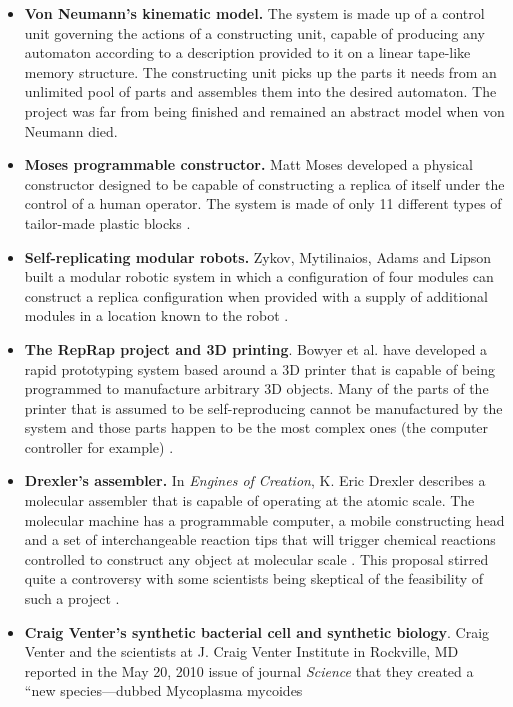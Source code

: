 \begin{itemize}
\item \textbf{Von Neumann’s kinematic model.} The system is made up of a
control unit governing the actions of a constructing unit, capable of
producing any automaton according to a description provided to it on a
linear tape-like memory structure. The constructing unit picks up the
parts it needs from an unlimited pool of parts and assembles them into
the desired automaton. The project was far from being finished and
remained an abstract model when von Neumann died.
\item \textbf{Moses{\textquotesingle} programmable constructor.} Matt Moses developed a physical constructor designed to be
capable of constructing a replica of itself under the control of a
human operator. The system is made of only 11 different types of
tailor-made plastic blocks \citep{moses2001}.
\item \textbf{Self-replicating modular robots.} Zykov, Mytilinaios,
Adams and Lipson built a modular robotic system in which a
configuration of four modules can construct a replica configuration
when provided with a supply of additional modules in a location known
to the robot \citep{zykovetal2005}.
\item \textbf{The RepRap project and 3D printing}. Bowyer et al.  have
developed a rapid prototyping system based around a 3D printer that is
capable of being programmed to manufacture arbitrary 3D objects. Many
of the parts of the printer that is assumed to be self-reproducing
cannot be manufactured by the system and those parts happen to be the
most complex ones (the computer controller for example) \citep{bowyer2007}.
\item \textbf{Drexler’s assembler.} In \textit{Engines of Creation}, K. Eric
Drexler describes a molecular assembler that is capable of operating at
the atomic scale. The molecular machine has a programmable computer, a
mobile constructing head and a set of interchangeable reaction tips
that will trigger chemical reactions controlled to construct any object
at molecular scale \citep{drexler1986}.
This proposal stirred quite a controversy with some
scientists being skeptical of the feasibility of such a project \citep{smalley2001}.
\item \textbf{Craig Venter’s synthetic bacterial cell and synthetic
biology}. Craig Venter and the scientists at
J. Craig Venter Institute in Rockville, MD
reported in the May 20, 2010 issue of journal
\textit{Science}
that they created a “new species---dubbed Mycoplasma mycoides

\end{itemize}
